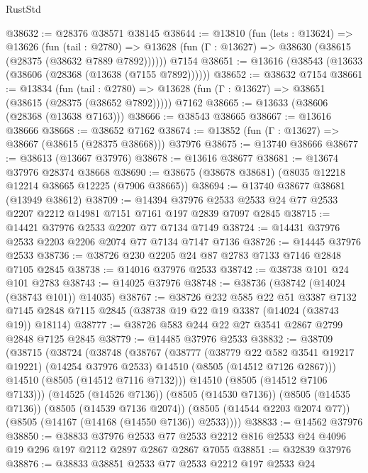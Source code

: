 \begin{lexlean}{RustStd}
\begin{coremodule}
@38632 := @28376 @38571 @38145
@38644 := @13810
    (fun (lets : @13624) =>
    @13626
      (fun (tail : @2780) =>
      @13628 (fun (Γ : @13627) => @38630 (@38615 (@28375 (@38632 @7889 @7892))))))
    @7154
@38651 := @13616 (@38543 (@13633 (@38606 (@28368 (@13638 (@7155 @7892))))))
@38652 := @38632 @7154
@38661 := @13834
    (fun (tail : @2780) => @13628 (fun (Γ : @13627) => @38651 (@38615 (@28375 (@38652 @7892)))))
    @7162
@38665 := @13633 (@38606 (@28368 (@13638 @7163)))
@38666 := @38543 @38665
@38667 := @13616 @38666
@38668 := @38652 @7162
@38674 := @13852 (fun (Γ : @13627) => @38667 (@38615 (@28375 @38668))) @37976
@38675 := @13740 @38666
@38677 := @38613 (@13667 @37976)
@38678 := @13616 @38677
@38681 := @13674 @37976 @28374 @38668
@38690 := @38675 (@38678 @38681) (@8035 @12218 @12214 @38665 @12225 (@7906 @38665))
@38694 := @13740 @38677 @38681 (@13949 @38612)
@38709 := @14394
    @37976
    @2533
    @2533
    @24
    @77
    @2533
    @2207
    @2212
    @14981
    @7151
    @7161
    @197
    @2839
    @7097
    @2845
@38715 := @14421 @37976 @2533 @2207 @77 @7134 @7149
@38724 := @14431 @37976 @2533 @2203 @2206 @2074 @77 @7134 @7147 @7136
@38726 := @14445 @37976 @2533
@38736 := @38726 @230 @2205 @24 @87 @2783 @7133 @7146 @2848 @7105 @2845
@38738 := @14016 @37976 @2533
@38742 := @38738 @101 @24 @101 @2783
@38743 := @14025 @37976
@38748 := @38736 (@38742 (@14024 (@38743 @101)) @14035)
@38767 := @38726
    @232
    @585
    @22
    @51
    @3387
    @7132
    @7145
    @2848
    @7115
    @2845
    (@38738 @19 @22 @19 @3387 (@14024 (@38743 @19)) @18114)
@38777 := @38726 @583 @244 @22 @27 @3541 @2867 @2799 @2848 @7125 @2845
@38779 := @14485 @37976 @2533
@38832 := @38709
    (@38715
      (@38724
        (@38748
          (@38767
            (@38777
              (@38779 @22 @582 @3541 @19217 @19221)
              (@14254 @37976 @2533)
              @14510
              (@8505 (@14512 @7126 @2867)))
            @14510
            (@8505 (@14512 @7116 @7132)))
          @14510
          (@8505 (@14512 @7106 @7133)))
        (@14525 (@14526 @7136))
        (@8505 (@14530 @7136))
        (@8505 (@14535 @7136))
        (@8505 (@14539 @7136 @2074))
        (@8505 (@14544 @2203 @2074 @77))
        (@8505 (@14167 (@14168 (@14550 @7136)) @2533))))
@38833 := @14562 @37976
@38850 := @38833
    @37976
    @2533
    @77
    @2533
    @2212
    @816
    @2533
    @24
    @4096
    @19
    @296
    @197
    @2112
    @2897
    @2867
    @2867
    @7055
@38851 := @32839 @37976
@38876 := @38833
    @38851
    @2533
    @77
    @2533
    @2212
    @197
    @2533
    @24

\end{coremodule}
\end{lexlean}
